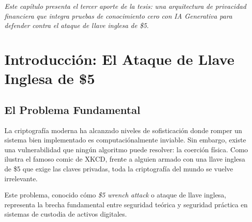 \documentclass[12pt,a4paper,twoside]{book}
\begin{document}
\begin{center}
\textit{Este capítulo presenta el tercer aporte de la tesis: una arquitectura de privacidad financiera que integra pruebas de conocimiento cero con IA Generativa para defender contra el ataque de llave inglesa de \$5.}
\end{center}

\vspace{0.5cm}


\vspace{1cm}

\section{Introducción: El Ataque de Llave Inglesa de \$5}

\subsection{El Problema Fundamental}

La criptografía moderna ha alcanzado niveles de sofisticación donde romper un sistema bien implementado es computaciónalmente inviable. Sin embargo, existe una vulnerabilidad que ningún algoritmo puede resolver: la coerción física. Como ilustra el famoso comic de XKCD, frente a alguien armado con una llave inglesa de \$5 que exige las claves privadas, toda la criptografía del mundo se vuelve irrelevante.

Este problema, conocido cómo \textit{\$5 wrench attack} o ataque de llave inglesa, representa la brecha fundamental entre seguridad teórica y seguridad práctica en sistemas de custodia de activos digitales.
\end{document}
